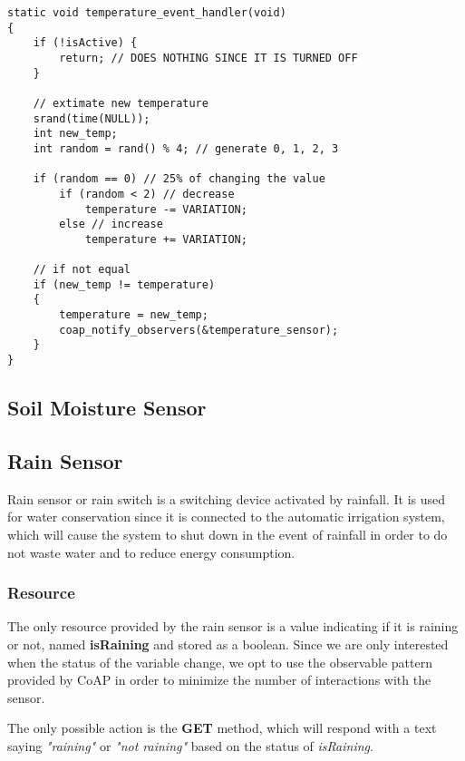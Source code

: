 \begin{lstlisting}
static void temperature_event_handler(void)
{
    if (!isActive) {
        return; // DOES NOTHING SINCE IT IS TURNED OFF
    }
    
    // extimate new temperature
    srand(time(NULL));
    int new_temp;
    int random = rand() % 4; // generate 0, 1, 2, 3
    
    if (random == 0) // 25% of changing the value
        if (random < 2) // decrease
            temperature -= VARIATION;
        else // increase
            temperature += VARIATION;

    // if not equal
    if (new_temp != temperature)
    {
        temperature = new_temp;
        coap_notify_observers(&temperature_sensor);
    }
}
\end{lstlisting}



\subsection{Soil Moisture Sensor}










\subsection{Rain Sensor}
Rain sensor or rain switch is a switching device activated by rainfall. It is used for water conservation since it is connected to the automatic irrigation system, which will cause the system to shut down in the event of rainfall in order to do not waste water and to reduce energy consumption.

\subsubsection{Resource}
The only resource provided by the rain sensor is a value indicating if it is raining or not, named \textbf{isRaining} and stored as a boolean. Since we are only interested when the status of the variable change, we opt to use the observable pattern provided by CoAP in order to minimize the number of interactions with the sensor.

The only possible action is the \textbf{GET} method, which will respond with a text saying \textit{"raining"} or \textit{"not raining"} based on the status of \textit{isRaining}.

